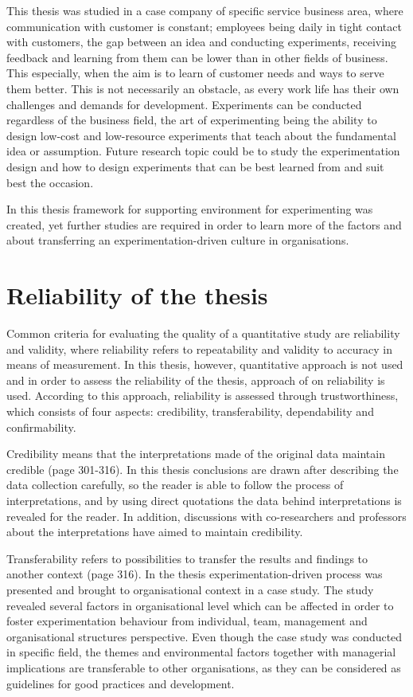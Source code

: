 This thesis was studied in a case company of specific service business area, where communication with customer is constant; employees being daily in tight contact with customers, the gap between an idea and conducting experiments, receiving feedback and learning from them can be lower than in other fields of business. This especially, when the aim is to learn of customer needs and ways to serve them better. This is not necessarily an obstacle, as every work life has their own challenges and demands for development. Experiments can be conducted regardless of the business field, the art of experimenting being the ability to design low-cost and low-resource experiments that teach about the fundamental idea or assumption. Future research topic could be to study the experimentation design and how to design experiments that can be best learned from and suit best the occasion. 

In this thesis framework for supporting environment for experimenting was created, yet further studies are required in order to learn more of the factors and about transferring an experimentation-driven culture in organisations. 

\section{Reliability of the thesis}
Common criteria for evaluating the quality of a quantitative study are reliability and validity, where reliability refers to repeatability and validity to accuracy in means of measurement. In this thesis, however, quantitative approach is not used and in order to assess the reliability of the thesis, approach of \citet{lincoln1985naturalistic} on reliability is used. According to this approach, reliability is assessed through trustworthiness, which consists of four aspects: credibility, transferability, dependability and confirmability. 

Credibility means that the interpretations made of the original data maintain credible \citep{lincoln1985naturalistic} (page 301-316). In this thesis conclusions are drawn after describing the data collection carefully, so the reader is able to follow the process of interpretations, and by using direct quotations the data behind interpretations is revealed for the reader. In addition, discussions with co-researchers and professors about the interpretations have aimed to maintain credibility. 

Transferability refers to possibilities to transfer the results and findings to another context \citep{lincoln1985naturalistic} (page 316). In the thesis experimentation-driven process was presented and brought to organisational context in a case study. The study revealed several factors in organisational level which can be affected in order to foster experimentation behaviour from individual, team, management and organisational structures perspective. Even though the case study was conducted in specific field, the themes and environmental factors together with managerial implications are transferable to other organisations, as they can be considered as guidelines for good practices and development. 

